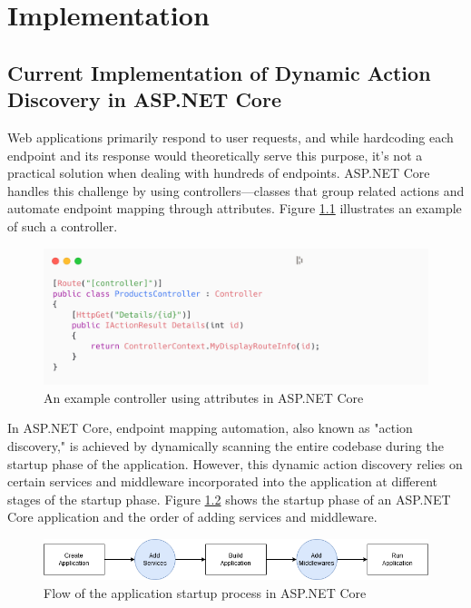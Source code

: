 \chapter{Implementation}

\section{Current Implementation of Dynamic Action Discovery in ASP.NET Core}

Web applications primarily respond to user requests, and while hardcoding each endpoint and its response would theoretically serve this purpose, it's not a practical solution when dealing with hundreds of endpoints. ASP.NET Core handles this challenge by using controllers—classes that group related actions and automate endpoint mapping through attributes. Figure \ref{fig:controller} illustrates an example of such a controller.

\begin{figure}[H]
\centering
\includegraphics[width=1\textwidth]{graphics/attribute-routing.png}
\caption{An example controller using attributes in ASP.NET Core}
\label{fig:controller}
\end{figure}

In ASP.NET Core, endpoint mapping automation, also known as "action discovery," is achieved by dynamically scanning the entire codebase during the startup phase of the application. However, this dynamic action discovery relies on certain services and middleware incorporated into the application at different stages of the startup phase. Figure \ref{fig:startup-phase} shows the startup phase of an ASP.NET Core application and the order of adding services and middleware.

\begin{figure}[H]
\centering
\includegraphics[width=1\textwidth]{graphics/startup-phase.png}
\caption{Flow of the application startup process in ASP.NET Core}
\label{fig:startup-phase}
\end{figure}

